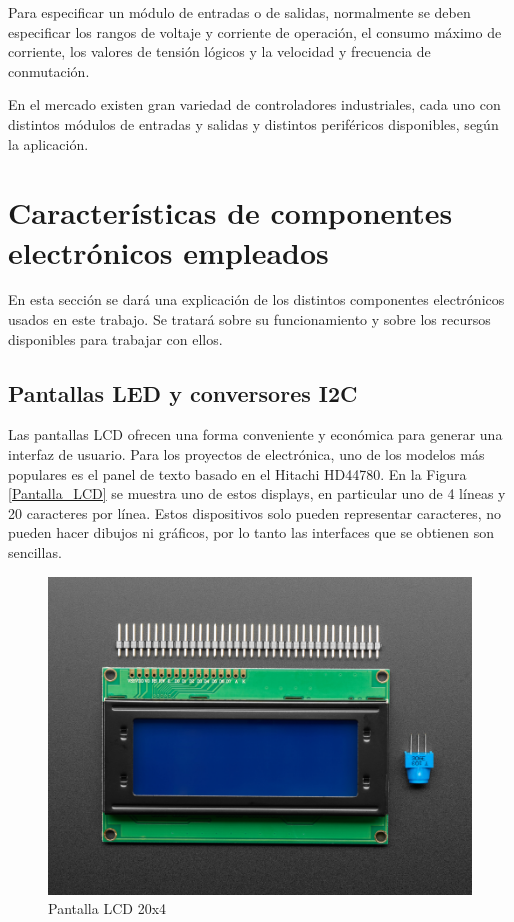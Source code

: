 Para especificar un módulo de entradas o de salidas, normalmente se deben especificar los rangos de voltaje y corriente de operación, el consumo máximo de corriente, los valores de tensión lógicos y la velocidad y frecuencia de conmutación.

En el mercado existen gran variedad de controladores industriales, cada uno con distintos módulos de entradas y salidas y distintos periféricos disponibles, según la aplicación. 

\section{Características de componentes electrónicos empleados}

En esta sección se dará una explicación de los distintos componentes electrónicos usados en este trabajo. Se tratará sobre su funcionamiento y sobre los recursos disponibles para trabajar con ellos.

\subsection{Pantallas LED y conversores I2C}

Las pantallas LCD ofrecen una forma conveniente y económica para generar una interfaz de usuario. Para los proyectos de electrónica, uno de los modelos más populares es el panel de texto basado en el Hitachi HD44780\citep{Arduino_Cookbook}. En la Figura \ref{Pantalla_LCD} se muestra uno de estos displays, en particular uno de 4 líneas y 20 caracteres por línea. Estos dispositivos solo pueden representar caracteres, no pueden hacer dibujos ni gráficos, por lo tanto las interfaces que se obtienen son sencillas.

\begin{figure}[htbp]
	\centering
	\includegraphics[scale=1.4]{./Figures/LCD.jpg}
	\caption{Pantalla LCD 20x4\protect\footnotemark}
	\label{fig:Pantalla_LCD}
\end{figure}


